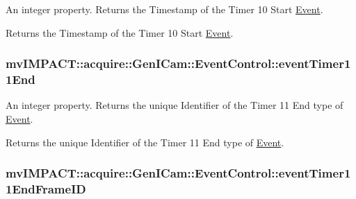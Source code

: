 An integer property. Returns the Timestamp of the Timer 10 Start \hyperlink{classmv_i_m_p_a_c_t_1_1acquire_1_1_event}{Event}. 

Returns the Timestamp of the Timer 10 Start \hyperlink{classmv_i_m_p_a_c_t_1_1acquire_1_1_event}{Event}. \hypertarget{classmv_i_m_p_a_c_t_1_1acquire_1_1_gen_i_cam_1_1_event_control_adc93d20dfb2b18fdbe44ef115829fa71}{
\subsubsection[{event\+Timer11\+End}]{ mv\+I\+M\+P\+A\+C\+T\+::acquire\+::\+Gen\+I\+Cam\+::\+Event\+Control\+::event\+Timer11\+End}}\label{classmv_i_m_p_a_c_t_1_1acquire_1_1_gen_i_cam_1_1_event_control_adc93d20dfb2b18fdbe44ef115829fa71}


An integer property. Returns the unique Identifier of the Timer 11 End type of \hyperlink{classmv_i_m_p_a_c_t_1_1acquire_1_1_event}{Event}. 

Returns the unique Identifier of the Timer 11 End type of \hyperlink{classmv_i_m_p_a_c_t_1_1acquire_1_1_event}{Event}. \hypertarget{classmv_i_m_p_a_c_t_1_1acquire_1_1_gen_i_cam_1_1_event_control_a79d91e8df0299e9a14b74c321dffd607}{
\subsubsection[{event\+Timer11\+End\+Frame\+I\+D}]{ mv\+I\+M\+P\+A\+C\+T\+::acquire\+::\+Gen\+I\+Cam\+::\+Event\+Control\+::event\+Timer11\+End\+Frame\+I\+D}}\label{classmv_i_m_p_a_c_t_1_1acquire_1_1_gen_i_cam_1_1_event_control_a79d91e8df0299e9a14b74c321dffd607}


